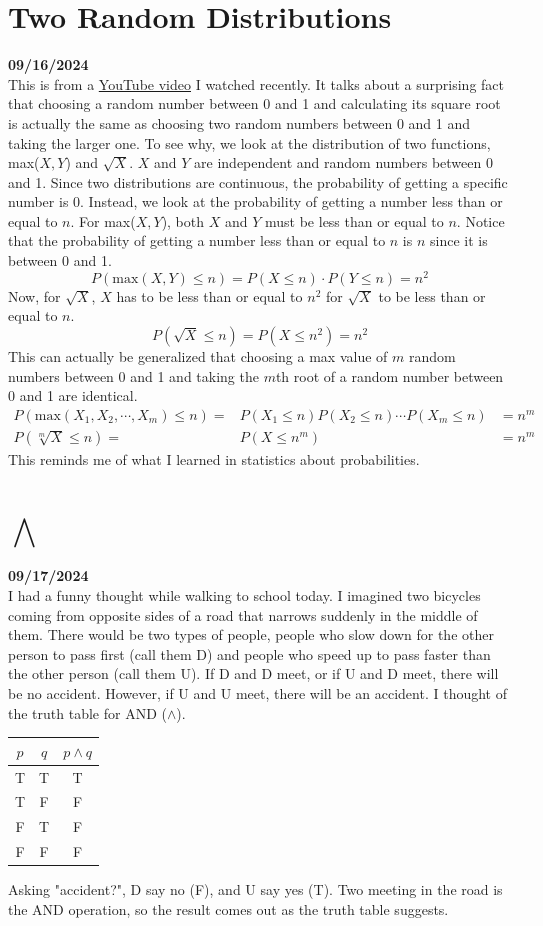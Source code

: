 \documentclass[12pt, oneside]{article}
\begin{document}
\section*{Two Random Distributions}
\textbf{09/16/2024}
\\
This is from a \href{https://www.youtube.com/watch?v=ga9Qk38FaHM}{YouTube video} I watched recently. It talks about a surprising fact that choosing a random number between 0 and 1 and calculating its square root is actually the same as choosing two random numbers between 0 and 1 and taking the larger one. To see why, we look at the distribution of two functions, max($X, Y$) and $\sqrt{X}$. $X$ and $Y$ are independent and random numbers between 0 and 1. Since two distributions are continuous, the probability of getting a specific number is 0. Instead, we look at the probability of getting a number less than or equal to $n$. For max($X, Y$), both $X$ and $Y$ must be less than or equal to $n$. Notice that the probability of getting a number less than or equal to $n$ is $n$ since it is between 0 and 1.
\[
P(\text{max}(X, Y) \leq n) = P(X \leq n) \cdot P(Y \leq n) = n^2
\]
Now, for $\sqrt{X}$, $X$ has to be less than or equal to $n^2$ for $\sqrt{X}$ to be less than or equal to $n$.
\[
P(\sqrt{X} \leq n) = P(X \leq n^2) = n^2
\]
This can actually be generalized that choosing a max value of $m$ random numbers between 0 and 1 and taking the $m$th root of a random number between 0 and 1 are identical. 
\begin{eqnarray*}
P(\text{max}(X_1, X_2, \cdots, X_m) \leq n) = & P(X_1 \leq n) P(X_2 \leq n) \cdots P(X_m \leq n) & = n^m\\
P(\sqrt[m]{X} \leq n) = & P(X \leq n^m) & = n^m
\end{eqnarray*}
This reminds me of what I learned in statistics about probabilities.
\section*{$\bigwedge$}
\textbf{09/17/2024}\\
I had a funny thought while walking to school today. I imagined two bicycles coming from opposite sides of a road that narrows suddenly in the middle of them. There would be two types of people, people who slow down for the other person to pass first (call them D) and people who speed up to pass faster than the other person (call them U). If D and D meet, or if U and D meet, there will be no accident. However, if U and U meet, there will be an accident. I thought of the truth table for AND ($\wedge$).
\begin{center}
\begin{tabular} {| c | c | c |}
\hline
$p$ & $q$ & $p \wedge q$\\
\hline
T & T & T\\
\hline
T & F & F\\
\hline
F & T & F\\
\hline
F & F & F\\
\hline
\end{tabular}
\end{center}
Asking "accident?", D say no (F), and U say yes (T). Two meeting in the road is the AND operation, so the result comes out as the truth table suggests.
\end{document}
